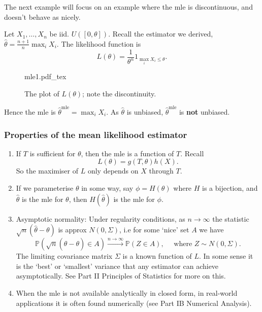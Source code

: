 \documentclass[a4paper]{scrartcl}
\newcommand{\incfig}[2]{%
    \def\svgwidth{#1mm}
    {#2.pdf_tex}
}
\begin{document}
The next example will focus on an example where the mle is discontinuous, and doesn't behave as nicely.
\begin{example*}
     Let $X_1 , \ldots , X_n $ be iid. $U ([0, \theta])$. Recall the estimator we derived, $\hat{\theta}=\frac{n+1}{n }\max_i X_i$. The likelihood function is \[
     L (\theta)=\frac{1}{\theta^{n}} 1_{\max_i X_i \leq \theta}
     .\]
     \begin{figure}[H]
          \centering
          \incfig{70}{mle1}
          \caption{The plot of $L (\theta)$; note the discontinuity.}
     \end{figure}
     Hence the mle is $\hat{\theta}^{\operatorname{mle}}=\max_i X_{i}$. As $\hat{\theta}$ is unbiased, $\hat{\theta}^{\operatorname{mle}}$ is \textbf{not} unbiased.
\end{example*}
\subsubsection{Properties of the mean likelihood estimator}
\begin{enumerate}
     \item If $T$ is sufficient for $\theta$, then the mle is a function of $T$. Recall \[
     L (\theta)=g (T, \theta)h (X)
     .\] So the maximiser of $L$ only depends on $X$ through $T$.
     \item If we parameterise $\theta$ in some way, say $\phi= H (\theta)$ where $H$ is a bijection, and $\hat{\theta}$ is the mle for $\theta$, then $H (\hat{\theta})$ is the mle for $\phi$.
     \item Asymptotic normality: Under regularity conditions, as $n \rightarrow \infty$ the statistic $\sqrt{n}(\hat{\theta}-\theta)$ is approx $N (0,\Sigma)$, i.e for some `nice' set $A$ we have \[
     \mathbb{P}(\sqrt{n}(\hat{\theta}-\theta) \in A) \xrightarrow{n \rightarrow \infty}\mathbb{P} (Z \in A), \quad \text{ where } Z \sim N (0, \Sigma)
     .\] The limiting covariance matrix $\Sigma$ is a known function of $L$. In some sense it is the `best' or `smallest' variance that any estimator can achieve asymptotically. See Part II Principles of Statistics for more on this.
     \item When the mle is not available analytically in closed form, in real-world applications it is often found numerically (see Part IB Numerical Analysis).
\end{enumerate}
\end{document}

